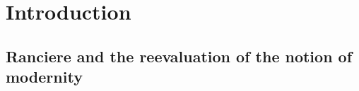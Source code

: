 \chapter{Introduction}

%

\section{Ranciere and the reevaluation of the \mbox{notion} of modernity}

